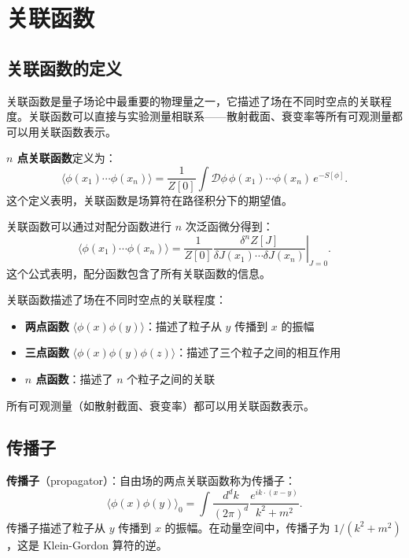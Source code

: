 \section{关联函数}

\subsection{关联函数的定义}

关联函数是量子场论中最重要的物理量之一，它描述了场在不同时空点的关联程度。关联函数可以直接与实验测量相联系——散射截面、衰变率等所有可观测量都可以用关联函数表示。

\begin{theorem}[$n$ 点关联函数]
\textbf{$n$ 点关联函数}定义为：
\begin{equation}
    \langle \phi(x_1) \cdots \phi(x_n) \rangle = \frac{1}{Z[0]} \int \mathcal{D}\phi \, \phi(x_1) \cdots \phi(x_n) \, e^{-S[\phi]}.
\end{equation}
这个定义表明，关联函数是场算符在路径积分下的期望值。
\end{theorem}

关联函数可以通过对配分函数进行 $n$ 次泛函微分得到：
\begin{equation}
    \langle \phi(x_1) \cdots \phi(x_n) \rangle = \frac{1}{Z[0]} \left. \frac{\delta^n Z[J]}{\delta J(x_1) \cdots \delta J(x_n)} \right|_{J=0}.
    \label{eq:QFT_corr}
\end{equation}
这个公式表明，配分函数包含了所有关联函数的信息。

\begin{note}[关联函数的物理意义]
关联函数描述了场在不同时空点的关联程度：
\begin{itemize}
    \item \textbf{两点函数} $\langle \phi(x) \phi(y) \rangle$：描述了粒子从 $y$ 传播到 $x$ 的振幅
    \item \textbf{三点函数} $\langle \phi(x) \phi(y) \phi(z) \rangle$：描述了三个粒子之间的相互作用
    \item \textbf{$n$ 点函数}：描述了 $n$ 个粒子之间的关联
\end{itemize}
所有可观测量（如散射截面、衰变率）都可以用关联函数表示。
\end{note}

\subsection{传播子}

\begin{definition}[传播子]
\textbf{传播子}（propagator）：自由场的两点关联函数称为传播子：
\begin{equation}
    \langle \phi(x) \phi(y) \rangle_0 = \int \frac{d^d k}{(2\pi)^d} \frac{e^{ik \cdot (x-y)}}{k^2 + m^2}.
\end{equation}
传播子描述了粒子从 $y$ 传播到 $x$ 的振幅。在动量空间中，传播子为 $1/(k^2 + m^2)$，这是 Klein-Gordon 算符的逆。
\end{definition}

